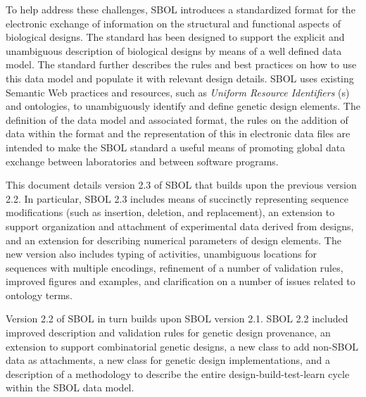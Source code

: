To help address these challenges, SBOL introduces a standardized format for the electronic exchange of information on the structural and functional aspects of biological designs. 
The standard has been designed to support the explicit and unambiguous description of biological designs by means of a well defined data model. 
The standard further describes the rules and best practices on how to use this data model and populate it with relevant design details. 
SBOL uses existing Semantic Web practices and resources, such as \emph{Uniform Resource Identifiers} (s) and ontologies, to unambiguously identify and define genetic design elements.
The definition of the data model and associated format, the rules on the addition of data within the format and the representation of this in electronic data files are intended to make the SBOL standard a useful means of promoting global data exchange between laboratories and between software programs.

This document details version 2.3 of SBOL that builds upon the previous version 2.2. In particular, SBOL 2.3 includes means of succinctly representing sequence modifications (such as insertion, deletion, and replacement), an extension to support organization and attachment of experimental data derived from designs,
and an extension for describing numerical parameters of design elements. The new version also includes typing of activities, unambiguous locations for sequences with multiple encodings, refinement of a number of validation rules, improved figures and examples, and clarification on a number of issues related to ontology terms. 


Version 2.2 of SBOL in turn builds upon SBOL version 2.1. SBOL 2.2 included improved description and validation rules for genetic design provenance, an extension to support combinatorial genetic designs, a new class to add non-SBOL data as attachments, a new class for genetic design implementations, and a description of a methodology to describe the entire design-build-test-learn cycle within the SBOL data model.


